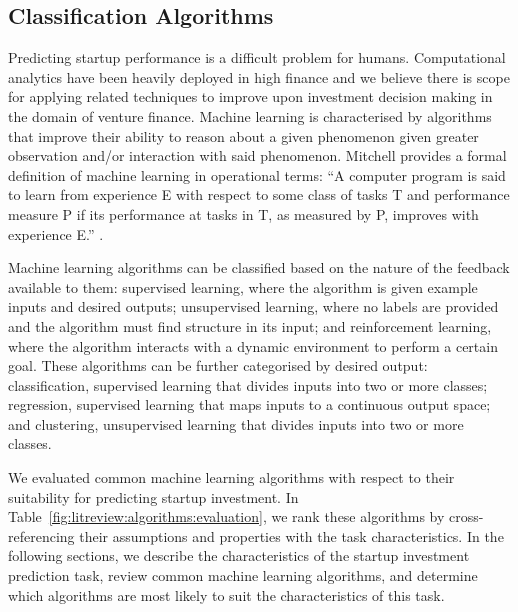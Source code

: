 \documentclass[../thesis/thesis.tex]{subfiles}
\begin{document}
\begin{refsection}
\section{Classification Algorithms}

Predicting startup performance is a difficult problem for humans. Computational analytics have been heavily deployed in high finance and we believe there is scope for applying related techniques to improve upon investment decision making in the domain of venture finance. Machine learning is characterised by algorithms that improve their ability to reason about a given phenomenon given greater observation and/or interaction with said phenomenon. Mitchell provides a formal definition of machine learning in operational terms: ``A computer program is said to learn from experience E with respect to some class of tasks T and performance measure P if its performance at tasks in T, as measured by P, improves with experience E.'' \cite{mitchell1997}.

Machine learning algorithms can be classified based on the nature of the feedback available to them: supervised learning, where the algorithm is given example inputs and desired outputs; unsupervised learning, where no labels are provided and the algorithm must find structure in its input; and reinforcement learning, where the algorithm interacts with a dynamic environment to perform a certain goal. These algorithms can be further categorised by desired output: classification, supervised learning that divides inputs into two or more classes; regression, supervised learning that maps inputs to a continuous output space; and clustering, unsupervised learning that divides inputs into two or more classes.

We evaluated common machine learning algorithms with respect to their suitability for predicting startup investment. In Table~\ref{fig:litreview:algorithms:evaluation}, we rank these algorithms by cross-referencing their assumptions and properties with the task characteristics. In the following sections, we describe the characteristics of the startup investment prediction task, review common machine learning algorithms, and determine which algorithms are most likely to suit the characteristics of this task.


\end{refsection}
\end{document}
